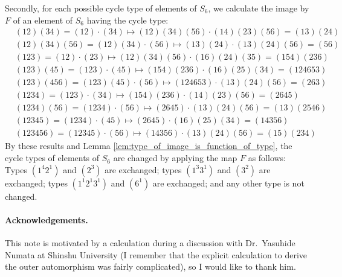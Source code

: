 \documentclass[11pt]{article}
\begin{document}
Secondly, for each possible cycle type of elements of $S_6$, we calculate the image by $F$ of an element of $S_6$ having the cycle type:
\begin{displaymath}
\begin{split}
&(12)(34) = (12) \cdot (34) \mapsto (12)(34)(56) \cdot (14)(23)(56) = (13)(24) \\
&(12)(34)(56) = (12)(34) \cdot (56) \mapsto (13)(24) \cdot (13)(24)(56) = (56) \\
&(123) = (12) \cdot (23) \mapsto (12)(34)(56) \cdot (16)(24)(35) = (154)(236) \\
&(123)(45) = (123) \cdot (45) \mapsto (154)(236) \cdot (16)(25)(34) = (124653) \\
&(123)(456) = (123)(45) \cdot (56) \mapsto (124653) \cdot (13)(24)(56) = (263) \\
&(1234) = (123) \cdot (34) \mapsto (154)(236) \cdot (14)(23)(56) = (2645) \\
&(1234)(56) = (1234) \cdot (56) \mapsto (2645) \cdot (13)(24)(56) = (13)(2546) \\
&(12345) = (1234) \cdot (45) \mapsto (2645) \cdot (16)(25)(34) = (14356) \\
&(123456) = (12345) \cdot (56) \mapsto (14356) \cdot (13)(24)(56) = (15)(234)
\end{split}
\end{displaymath}
By these results and Lemma \ref{lem:type_of_image_is_function_of_type}, the cycle types of elements of $S_6$ are changed by applying the map $F$ as follows: Types $(1^4 2^1)$ and $(2^3)$ are exchanged; types $(1^3 3^1)$ and $(3^2)$ are exchanged; types $(1^1 2^1 3^1)$ and $(6^1)$ are exchanged; and any other type is not changed.

\paragraph{Acknowledgements.}
This note is motivated by a calculation during a discussion with Dr.~Yasuhide Numata at Shinshu University (I remember that the explicit calculation to derive the outer automorphism was fairly complicated), so I would like to thank him.
\end{document}
